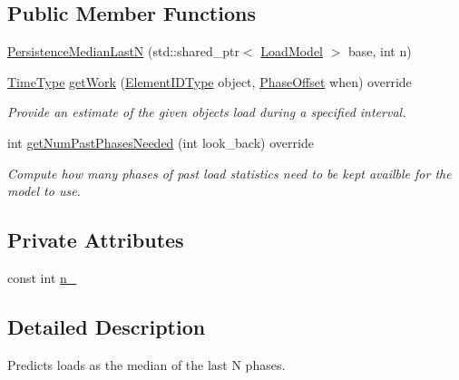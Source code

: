 \subsection*{Public Member Functions}
\begin{DoxyCompactItemize}
\item 
\hyperlink{structvt_1_1vrt_1_1collection_1_1balance_1_1_persistence_median_last_n_a09ee029e7afbfd963fb0c5b3a0591b51}{Persistence\+Median\+LastN} (std\+::shared\+\_\+ptr$<$ \hyperlink{classvt_1_1vrt_1_1collection_1_1balance_1_1_load_model}{Load\+Model} $>$ base, int n)
\item 
\hyperlink{namespacevt_a876a9d0cd5a952859c72de8a46881442}{Time\+Type} \hyperlink{structvt_1_1vrt_1_1collection_1_1balance_1_1_persistence_median_last_n_ac8ce962b50e41326109cc2f87fa19cf0}{get\+Work} (\hyperlink{namespacevt_1_1vrt_1_1collection_1_1balance_a14c8d2c972f2913aa3f1636e5be0a120}{Element\+I\+D\+Type} object, \hyperlink{structvt_1_1vrt_1_1collection_1_1balance_1_1_phase_offset}{Phase\+Offset} when) override
\begin{DoxyCompactList}\small\item\em Provide an estimate of the given object\textquotesingle{}s load during a specified interval. \end{DoxyCompactList}\item 
int \hyperlink{structvt_1_1vrt_1_1collection_1_1balance_1_1_persistence_median_last_n_a236ce9aa3fc3a38111160fc8c4a0e336}{get\+Num\+Past\+Phases\+Needed} (int look\+\_\+back) override
\begin{DoxyCompactList}\small\item\em Compute how many phases of past load statistics need to be kept availble for the model to use. \end{DoxyCompactList}\end{DoxyCompactItemize}
\subsection*{Private Attributes}
\begin{DoxyCompactItemize}
\item 
const int \hyperlink{structvt_1_1vrt_1_1collection_1_1balance_1_1_persistence_median_last_n_acbc7348e1494f9db0a49321fe48b32d4}{n\+\_\+}
\end{DoxyCompactItemize}


\subsection{Detailed Description}
Predicts loads as the median of the last N phases. 

